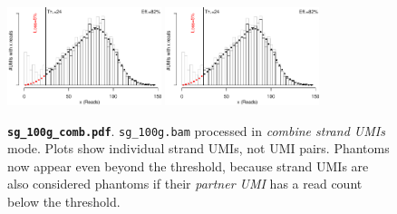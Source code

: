 \documentclass{scrartcl}
\begin{document}
\begin{figure}[H]
{\centering
\includegraphics[width=0.4\textwidth,page=1]{../examples/sg_100g_comb.pdf}\hfill
\includegraphics[width=0.4\textwidth,page=2]{../examples/sg_100g_comb.pdf}
\\}
\caption*{\textbf{\texttt{sg\_100g\_comb.pdf}}. \texttt{sg\_100g.bam} processed in \emph{combine strand UMIs} mode. Plots show individual strand UMIs, not UMI pairs. Phantoms now appear even beyond the threshold, because strand UMIs are also considered phantoms if their \emph{partner UMI} has a read count below the threshold.}
\end{figure}
\end{document}
